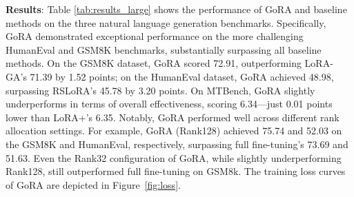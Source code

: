 \setlength{\textfloatsep}{5pt}
\begin{table}[ht!]
\centering
\caption{Performance of fine-tuning Llama-3.1-8B-Base on MTBench, GSM8k, and HumanEval. GoRA demonstrates substantial improvements over baseline LoRA variants. In high average rank settings (Rank32 and Rank128), GoRA even surpasses full fine-tuning on GSM8k and HumanEval in a large margin. Unless stated otherwise, the LoRA rank or average rank of GoRA is set to 8.}
\label{tab:results_large}
\end{table}

\textbf{Results}: Table \ref{tab:results_large} shows the performance of GoRA and baseline methods on the three natural language generation benchmarks. Specifically, GoRA demonstrated exceptional performance on the more challenging HumanEval and GSM8K benchmarks, substantially surpassing all baseline methods. On the GSM8K dataset, GoRA scored 72.91, outperforming LoRA-GA's 71.39 by 1.52 points; on the HumanEval dataset, GoRA achieved 48.98, surpassing RSLoRA's 45.78 by 3.20 points. On MTBench, GoRA slightly underperforms in terms of overall effectiveness, scoring 6.34—just 0.01 points lower than LoRA+'s 6.35. Notably, GoRA performed well across different rank allocation settings. For example, GoRA (Rank128) achieved 75.74 and 52.03 on the GSM8K and HumanEval, respectively, surpassing full fine-tuning's 73.69 and 51.63. Even the Rank32 configuration of GoRA, while slightly underperforming Rank128, still outperformed full fine-tuning on GSM8k. The training loss curves of GoRA are depicted in Figure~\ref{fig:loss}.


